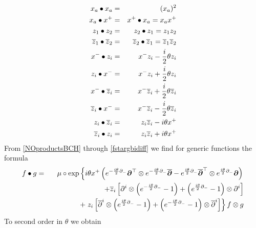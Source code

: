 \begin{eqnarray}
  \label{TOsymcoordstarprods}
  x_a\bullet x_a&=&(x_a)^2 \\\nonumber
  x_a\bullet x^+&=&x^+\bullet x_a = x_a x^+ \\\nonumber
  z_1\bullet z_2&=&z_2\bullet z_1= z_1 z_2 \\\nonumber
  \overline{z}_1\bullet \overline{z}_2&=&\overline{z}_2\bullet \overline{z}_1
        = \overline{z}_1 \overline{z}_2 \\\nonumber
  x^-\bullet z_i&=&x^- z_i-\frac i2\theta z_i \\\nonumber
  z_i\bullet x^-&=&x^- z_i+\frac i2\theta z_i \\\nonumber
  x^-\bullet \overline{z}_i&=&x^- \overline{z}_i+\frac i2
  \theta \overline{z}_i \\\nonumber
  \overline{z}_i\bullet x^-&=&x^- \overline{z}_i
  -\frac i2\theta \overline{z}_i \\\nonumber
  z_i\bullet \overline{z}_i&=&z_i \overline{z}_i- i\theta x^+ \\\nonumber
  \overline{z}_i\bullet z_i &=&z_i \overline{z}_i+ i\theta x^+
\end{eqnarray}
From \eqref{NOproductsBCH} through \eqref{fstargbidiff} we find for generic
functions the formula
\begin{eqnarray}
  \label{TOsymstargen}
  f\bullet g&=&\mu\circ\exp\left\{ i\theta x^+ \left( e^{-\frac{ i\theta}2
        \partial_-} {{\boldsymbol {\partial} }}^\top\otimes e^{-\frac{ i\theta}2 \partial_-} 
      \overline{{{\boldsymbol {\partial} }}}- e^{\frac{ i\theta}2 \partial_-} 
      \overline{{{\boldsymbol {\partial} }}}^{ \top}\otimes e^{\frac{ i\theta}2 \partial_-} 
      {{\boldsymbol {\partial} }}\right)\right.\\\nonumber
  &&\qquad\qquad+ \overline{z}_i \left[\partial^i\otimes
    \left( e^{-\frac{ i\theta}2 \partial_-}-1\right)
    +\left( e^{\frac{ i\theta}2 \partial_-}-1\right)\otimes
    \partial^i\right]\\\nonumber
  &&\qquad\qquad+\left.
    z_i \left[ \overline{\partial}^{ i}\otimes
      \left( e^{\frac{ i\theta}2 \partial_-}-1\right)
      +\left( e^{-\frac{ i\theta}2 \partial_-}-1\right)
      \otimes\overline{\partial}^{ i}\right]\right\}f\otimes g
\end{eqnarray}
To second order in $\theta$ we obtain
